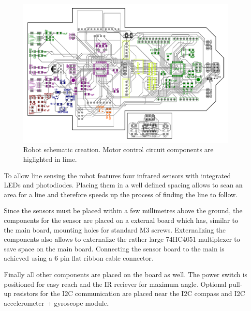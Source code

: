 \documentclass[11pt,a4paper]{article}
\begin{document}
\begin{figure}[H]
  \centering
  \includegraphics[width=\textwidth]{robot_schematic_motor.pdf}
  \caption{Robot schematic creation. Motor control circuit components are higlighted in lime.}
\end{figure}

To allow line sensing the robot features four infrared sensors with integrated LEDs and photodiodes. Placing them in a well defined spacing allows to scan an area for a line and therefore speeds up the process of finding the line to follow.

Since the sensors must be placed within a few millimetres above the ground, the components for the sensor are placed on a external board which has, similar to the main board, mounting holes for standard M3 screws. Externalizing the components also allows to externalize the rather large 74HC4051 multiplexer to save space on the main board. Connecting the sensor board to the main is achieved using a 6 pin flat ribbon cable connector.

%
%

Finally all other components are placed on the board as well. The power switch is positioned for easy reach and the IR reciever for maximum angle. Optional pull-up resistors for the I2C communication are placed near the I2C compass and I2C accelerometer + gyroscope module. 
\end{document}
